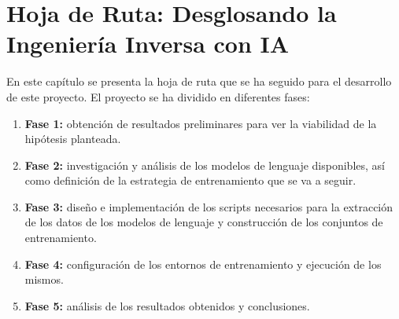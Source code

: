 \chapter{Hoja de Ruta: Desglosando la Ingeniería Inversa con IA}
\label{cap:hoja_de_ruta}

En este capítulo se presenta la hoja de ruta que se ha seguido para el desarrollo de
este proyecto. El proyecto se ha dividido en diferentes fases:

\begin{enumerate}
    \item \textbf{Fase 1:} obtención de resultados preliminares para ver la viabilidad 
        de la hipótesis planteada.
    \item \textbf{Fase 2:} investigación y análisis de los modelos de lenguaje disponibles,
        así como definición de la estrategia de entrenamiento que se va a seguir.
    \item \textbf{Fase 3:} diseño e implementación de los scripts necesarios para la
        extracción de los datos de los modelos de lenguaje y construcción de los 
        conjuntos de entrenamiento.
    \item \textbf{Fase 4:} configuración de los entornos de entrenamiento y ejecución de
        los mismos.
    \item \textbf{Fase 5:} análisis de los resultados obtenidos y conclusiones.
\end{enumerate}